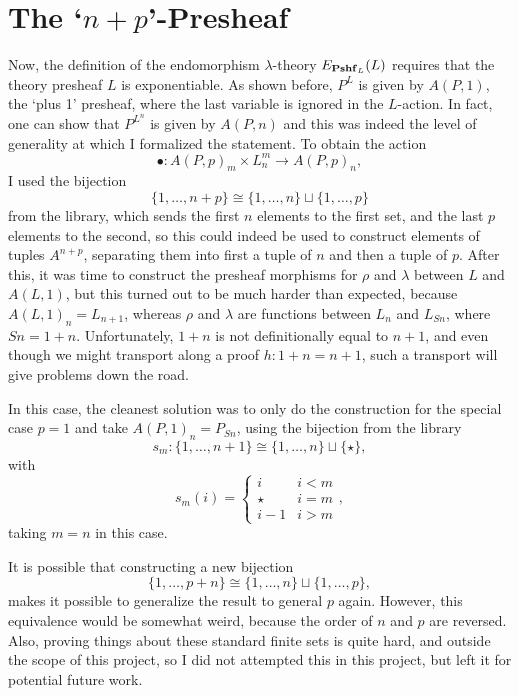 \section{The `\texorpdfstring{$ n + p $}{n + p}'-Presheaf}
Now, the definition of the endomorphism $ \lambda $-theory $ E_{\mathbf{Pshf}_{L}}(L) $ requires that the theory presheaf $ L $ is exponentiable. As shown before, $ P^L $ is given by $ A(P, 1) $, the `plus 1' presheaf, where the last variable is ignored in the $ L $-action. In fact, one can show that $ P^{L^n} $ is given by $ A(P, n) $ and this was indeed the level of generality at which I formalized the statement. To obtain the action
\[ \bullet : A(P, p)_m \times L_n^m \to A(P, p)_n, \]
I used the bijection
\[ \{ 1, \dots, n + p \} \cong \{ 1, \dots, n \} \sqcup \{ 1, \dots, p \} \]
from the library, which sends the first $ n $ elements to the first set, and the last $ p $ elements to the second, so this could indeed be used to construct elements of tuples $ A^{n + p} $, separating them into first a tuple of $ n $ and then a tuple of $ p $. After this, it was time to construct the presheaf morphisms for $ \rho $ and $ \lambda $ between $ L $ and $ A(L, 1) $, but this turned out to be much harder than expected, because $ A(L, 1)_n = L_{n + 1} $, whereas $ \rho $ and $ \lambda $ are functions between $ L_n $ and $ L_{S n} $, where $ S n = 1 + n $. Unfortunately, $ 1 + n $ is not definitionally equal to $ n + 1 $, and even though we might transport along a proof $ h: 1 + n = n + 1 $, such a transport will give problems down the road.

In this case, the cleanest solution was to only do the construction for the special case $ p = 1 $ and take $ A(P, 1)_n = P_{S n} $, using the bijection from the library
\[ s_m: \{ 1, \dots, n + 1 \} \cong \{ 1, \dots, n \} \sqcup \{ \star \}, \]
with
\[ s_m(i) = \left\{ \begin{array}{cc}
    i & i < m\\
    \star & i = m\\
    i - 1 & i > m
\end{array}\right. ,  \]
taking $ m = n $ in this case.

It is possible that constructing a new bijection
\[ \{ 1, \dots, p + n \} \cong \{1, \dots, n\} \sqcup \{1, \dots, p\}, \]
makes it possible to generalize the result to general $ p $ again. However, this equivalence would be somewhat weird, because the order of $ n $ and $ p $ are reversed. Also, proving things about these standard finite sets is quite hard, and outside the scope of this project, so I did not attempted this in this project, but left it for potential future work.

